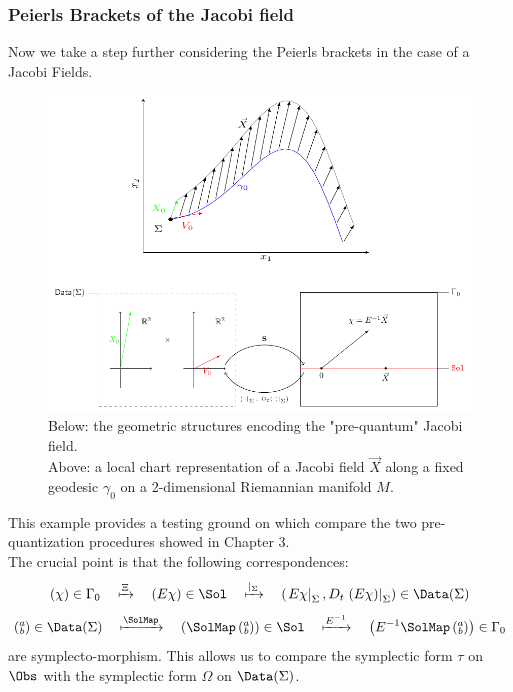 \documentclass[Main]{subfiles}
\begin{document}
		\subsubsection{Peierls Brackets of the Jacobi field}
		Now we take a step further considering the Peierls brackets in the case of a Jacobi Fields.
		\begin{figure}[h!]
			\includegraphics[width=\textwidth]{Pictures/Jacobi_GeometricPicturePanoramica}	
			\caption{ 
			Below: the geometric structures encoding the "pre-quantum" Jacobi field.
			\\
			Above: a local chart representation of a Jacobi field $\vec{X}$ along a fixed geodesic $\gamma_0$ on a  2-dimensional Riemannian manifold $M$.
			}	
		\end{figure}				

		This example provides a testing ground on which compare the two pre-quantization procedures showed in Chapter 3.\\
		The crucial point is that the following correspondences:
		\begin{displaymath}
			(\chi) \in \Gamma_0 \quad \xmapsto{\Xi} \quad (E \chi) \in \Sol \quad \xmapsto{\vert_\Sigma} \quad 
			 \left(\left. E\chi \right\vert_\Sigma , D_t\left.\left( E \chi \right)\right\vert_\Sigma \right) \in\Data(\Sigma)
		\end{displaymath}
		\begin{displaymath}
			 \left(\substack{a\\b}\right) \in\Data(\Sigma) \quad \xmapsto{\SolMap} \quad
			 \left( \SolMap \left(\substack{a\\b}\right) \right)\in \Sol \quad \xmapsto{E^{-1}} \quad 
			 \left( E^{-1}\SolMap \left(\substack{a\\b}\right) \right) \in \Gamma_0
		\end{displaymath}
		are symplecto-morphism. This allows us to compare the symplectic form $\tau$ on $\Obs$ with the symplectic form $\Omega$ on $\Data(\Sigma)$.
		
\end{document}
